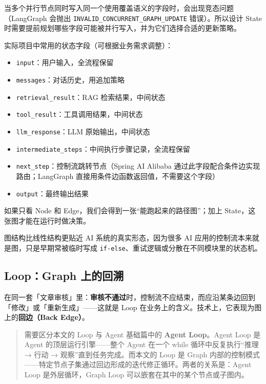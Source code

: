 \documentclass[10pt,a4paper]{ctexart}
\begin{document}
当多个并行节点同时写入同一个使用覆盖语义的字段时，会出现竞态问题（LangGraph 会抛出 \texttt{INVALID\_CONCURRENT\_GRAPH\_UPDATE} 错误）。所以设计 State 时需要提前规划哪些字段可能被并行写入，并为它们选择合适的更新策略。



实际项目中常用的状态字段（可根据业务需求调整）：


\begin{itemize}[itemsep=2pt, topsep=4pt]
  \item \texttt{input}：用户输入，全流程保留
  \item \texttt{messages}：对话历史，用追加策略
  \item \texttt{retrieval\_result}：RAG 检索结果，中间状态
  \item \texttt{tool\_result}：工具调用结果，中间状态
  \item \texttt{llm\_response}：LLM 原始输出，中间状态
  \item \texttt{intermediate\_steps}：中间执行步骤记录，全流程保留
  \item \texttt{next\_step}：控制流跳转节点（Spring AI Alibaba 通过此字段配合条件边实现路由；LangGraph 直接用条件边函数返回值，不需要这个字段）
  \item \texttt{output}：最终输出结果
\end{itemize}


如果只看 Node 和 Edge，我们会得到一张“能跑起来的路径图”；加上 State，这张图才能在运行时做决策。



图结构比线性结构更贴近 AI 系统的真实形态，因为很多 AI 应用的控制流本来就是图，只是早期常被临时写成 \texttt{if-else}、重试逻辑或分散在不同模块里的状态机。



\subsection{Loop：Graph 上的回溯}


在同一套「文章审核」里：\textbf{审核不通过}时，控制流不应结束，而应沿某条边回到「修改」或「重新生成」——这就是 Loop 在业务上的含义。技术上，它表现为图上的\textbf{回边（Back Edge）}。



\begin{quote}
需要区分本文的 Loop 与 Agent 基础篇中的 \textbf{Agent Loop}。Agent Loop 是 Agent 的顶层运行引擎——整个 Agent 在一个 while 循环中反复执行“推理 → 行动 → 观察”直到任务完成。而本文的 Loop 是 Graph 内部的控制模式——特定节点子集通过回边形成的迭代修正循环。两者的关系是：Agent Loop 是外层循环，Graph Loop 可以嵌套在其中的某个节点或子图内。
\end{quote}
\end{document}
